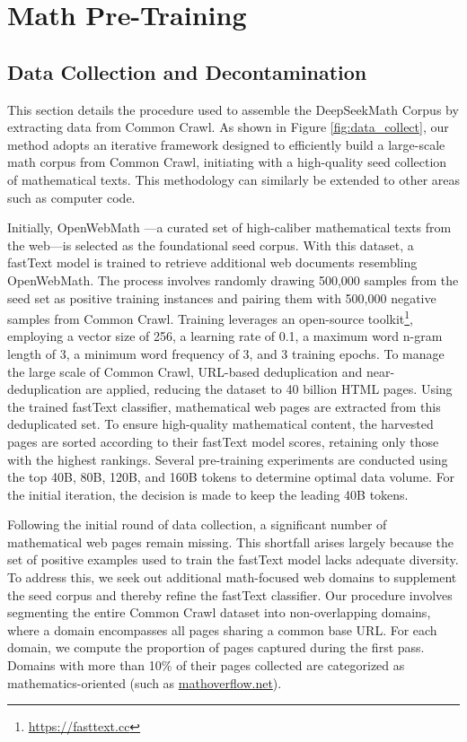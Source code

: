 \section{Math Pre-Training}

\subsection{Data Collection and Decontamination} This section details the procedure used to assemble the DeepSeekMath Corpus by extracting data from Common Crawl. As shown in Figure \ref{fig:data_collect}, our method adopts an iterative framework designed to efficiently build a large-scale math corpus from Common Crawl, initiating with a high-quality seed collection of mathematical texts. This methodology can similarly be extended to other areas such as computer code.

Initially, OpenWebMath \citep{openwebmath}—a curated set of high-caliber mathematical texts from the web—is selected as the foundational seed corpus. With this dataset, a fastText model \citep{joulin2016fasttext} is trained to retrieve additional web documents resembling OpenWebMath. The process involves randomly drawing 500,000 samples from the seed set as positive training instances and pairing them with 500,000 negative samples from Common Crawl. Training leverages an open-source toolkit\footnote{\url{https://fasttext.cc}}, employing a vector size of 256, a learning rate of 0.1, a maximum word n-gram length of 3, a minimum word frequency of 3, and 3 training epochs. To manage the large scale of Common Crawl, URL-based deduplication and near-deduplication are applied, reducing the dataset to 40 billion HTML pages. Using the trained fastText classifier, mathematical web pages are extracted from this deduplicated set. To ensure high-quality mathematical content, the harvested pages are sorted according to their fastText model scores, retaining only those with the highest rankings. Several pre-training experiments are conducted using the top 40B, 80B, 120B, and 160B tokens to determine optimal data volume. For the initial iteration, the decision is made to keep the leading 40B tokens.

Following the initial round of data collection, a significant number of mathematical web pages remain missing. This shortfall arises largely because the set of positive examples used to train the fastText model lacks adequate diversity. To address this, we seek out additional math-focused web domains to supplement the seed corpus and thereby refine the fastText classifier. Our procedure involves segmenting the entire Common Crawl dataset into non-overlapping domains, where a domain encompasses all pages sharing a common base URL. For each domain, we compute the proportion of pages captured during the first pass. Domains with more than 10\% of their pages collected are categorized as mathematics-oriented (such as \url{mathoverflow.net}). 

